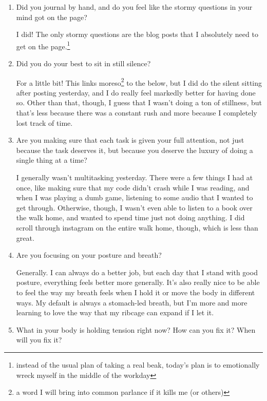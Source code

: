 \documentclass[12pt]{article}
\renewcommand{\,}{\textsuperscript{,}}
\begin{document}
\begin{enumerate}

\item Did you journal by hand, and do you feel like the stormy questions in your mind got on the page?

I did! The only stormy questions are the blog posts that I absolutely need to get on the page.\footnote{instead of the usual plan of taking a real beak, today's plan is to emotionally wreck myself in the middle of the workday}

\item Did you do your best to sit in still silence?

For a little bit! This links moreso\footnote{a word I will bring into common parlance if it kills me (or others)} to the below, but I did do the silent sitting after posting yesterday, and I do really feel markedly better for having done so.  
Other than that, though, I guess that I wasn't doing a ton of stillness, but that's less because there was a constant rush and more because I completely lost track of time.

\item Are you making sure that each task is given your full attention, not just because the task deserves it, but because you deserve the luxury of doing a single thing at a time?

I generally wasn't multitasking yesterday.  
There were a few things I had at once, like making sure that my code didn't crash while I was reading, and when I was playing a dumb game, listening to some audio that I wanted to get through.  
Otherwise, though, I wasn't even able to listen to a book over the walk home, and wanted to spend time just not doing anything.  
I did scroll through instagram on the entire walk home, though, which is less than great.

\item Are you focusing on your posture and breath?

Generally. I can always do a better job, but each day that I stand with good posture, everything feels better more generally.  
It's also really nice to be able to feel the way my breath feels when I hold it or move the body in different ways.  
My default is always a stomach-led breath, but I'm more and more learning to love the way that my ribcage can expand if I let it.

\item What in your body is holding tension right now? How can you fix it? When will you fix it?


\end{enumerate}
\end{document}
